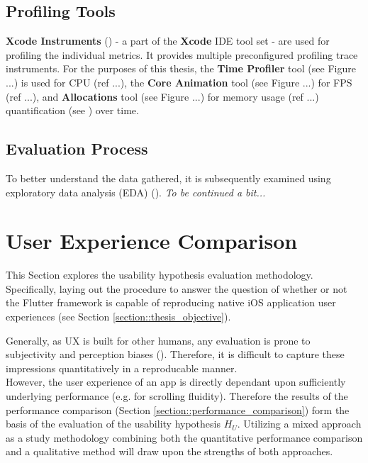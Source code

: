 \subsection{Profiling Tools} \label{subsection::profiling_tooling}
\textbf{Xcode Instruments} (\cite{Apple2019}) - a part of the \textbf{Xcode} IDE tool set - are used for profiling the individual metrics. It provides multiple preconfigured
profiling trace instruments.
For the purposes of this thesis, the \textbf{Time Profiler} tool (see Figure ...) is used for CPU (ref ...), the \textbf{Core Animation} tool (see Figure ...) for FPS (ref ...), and 
\textbf{Allocations} tool (see Figure ...) for memory usage (ref ...) quantification (see ) over time.


\subsection{Evaluation Process} \label{subsection::evaluation_process}
To better understand the data gathered, it is subsequently examined using exploratory data
analysis (EDA) (\cite{Tukey1977}). \textit{To be continued a bit...}


\section{User Experience Comparison} \label{section::usability_comparison_design}
This Section explores the usability hypothesis evaluation methodology. Specifically, laying out
the procedure to answer the question of whether or not the Flutter framework is capable of
reproducing native iOS application user experiences (see Section \ref{section::thesis_objective}).

Generally, as UX is built for other humans, any evaluation is prone to subjectivity and perception
biases (\cite{Tversky1974}). Therefore, it is difficult to capture these impressions quantitatively in a reproducable manner.\\
However, the user experience of an app is directly dependant upon sufficiently underlying performance (e.g. for scrolling
fluidity). Therefore the results of the performance comparison (Section \ref{section::performance_comparison}) form the basis of the evaluation of the usability hypothesis $H_U$.
Utilizing a mixed approach as a study methodology combining both the quantitative performance comparison and a qualitative method will draw upon the strengths of both approaches. 

